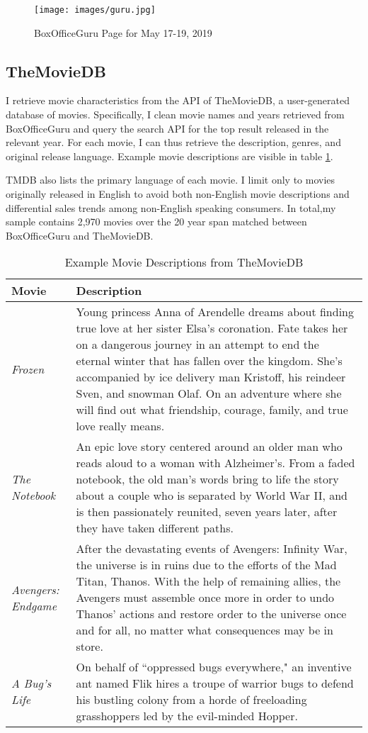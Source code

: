 \documentclass{article}
\begin{document}
\begin{figure}
    \texttt{[image: images/guru.jpg]}
    \caption{BoxOfficeGuru Page for May 17-19, 2019}
    \label{fig:guru}
\end{figure}


\subsection{TheMovieDB}

I retrieve movie characteristics from the API of TheMovieDB, a user-generated database of movies. Specifically, I clean movie names and years retrieved from BoxOfficeGuru and query the search API for the top result released in the relevant year. For each movie, I can thus retrieve the description, genres, and original release language. Example movie descriptions are visible in table \ref{tab:tmdb_desc}.

TMDB also lists the primary language of each movie. I limit only to movies originally released in English to avoid both non-English movie descriptions and differential sales trends among non-English speaking consumers. In total,my sample contains 2,970 movies over the 20 year span matched between BoxOfficeGuru and TheMovieDB.

\begin{table}
    \begin{tabular}{lp{11cm}}
        \toprule 
        \textbf{Movie} & \textbf{Description} \\
        \midrule
        \emph{Frozen} & Young princess Anna of Arendelle dreams about finding true love at her sister Elsa’s coronation. Fate takes her on a dangerous journey in an attempt to end the eternal winter that has fallen over the kingdom. She's accompanied by ice delivery man Kristoff, his reindeer Sven, and snowman Olaf. On an adventure where she will find out what friendship, courage, family, and true love really means. \\
        \emph{The Notebook} & An epic love story centered around an older man who reads aloud to a woman with Alzheimer's. From a faded notebook, the old man's words bring to life the story about a couple who is separated by World War II, and is then passionately reunited, seven years later, after they have taken different paths. \\
        \emph{Avengers: Endgame} & After the devastating events of Avengers: Infinity War, the universe is in ruins due to the efforts of the Mad Titan, Thanos. With the help of remaining allies, the Avengers must assemble once more in order to undo Thanos' actions and restore order to the universe once and for all, no matter what consequences may be in store. \\
        \emph{A Bug's Life} & On behalf of ``oppressed bugs everywhere," an inventive ant named Flik hires a troupe of warrior bugs to defend his bustling colony from a horde of freeloading grasshoppers led by the evil-minded Hopper. \\
        \bottomrule
    \end{tabular} 
    \caption{Example Movie Descriptions from TheMovieDB}
    \label{tab:tmdb_desc}
\end{table}
\end{document}

